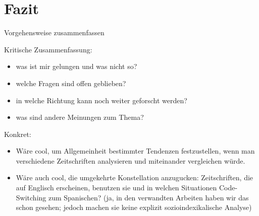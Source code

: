 \section{Fazit}

\begin{comment}
    * Einleitung und Fazit müssen zusammenpassen.
    * sind die Erkenntnisse im Fazit aus der Arbeit ableitbar?
    * Vorgehensweise zusammenfassen

\end{comment}

Vorgehensweise zusammenfassen

Kritische Zusammenfassung:
\begin{itemize}
    \item was ist mir gelungen und was nicht so?
    \item welche Fragen sind offen geblieben?
    \item in welche Richtung kann noch weiter geforscht werden?
    \item was sind andere Meinungen zum Thema?
\end{itemize}

Konkret:
\begin{itemize}
   \item Wäre cool, um Allgemeinheit bestimmter Tendenzen festzustellen, wenn man verschiedene Zeitschriften analysieren und miteinander vergleichen würde.
   \item Wäre auch cool, die umgekehrte Konstellation anzugucken: Zeitschriften, die auf Englisch erscheinen, benutzen sie und in welchen Situationen Code-Switching zum Spanischen? (ja, in den verwandten Arbeiten haben wir das schon gesehen; jedoch machen sie keine explizit sozioindexikalische Analyse)
\end{itemize}

